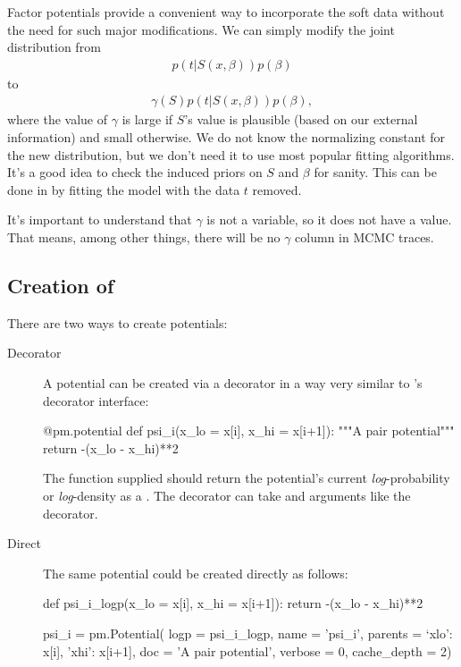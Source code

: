 \documentclass[]{jss}
\begin{document}
Factor potentials provide a convenient way to incorporate the soft data without the need for such major modifications. We can simply modify the joint distribution from
\begin{eqnarray*}
    p(t|S(x,\beta)) p(\beta)
\end{eqnarray*}
to
\begin{eqnarray*}
    \gamma(S) p(t|S(x,\beta)) p(\beta),
\end{eqnarray*}
where the value of $\gamma$ is large if $S$'s value is plausible (based on our external information) and small otherwise. We do not know the normalizing constant for the new distribution, but we don't need it to use most popular fitting algorithms. It's a good idea to check the induced priors on $S$ and $\beta$ for sanity. This can be done in  by fitting the model with the data $t$ removed.

It's important to understand that $\gamma$ is not a variable, so it does not have a value. That means, among other things, there will be no $\gamma$ column in MCMC traces.


\subsection[Creation of Potentials]{Creation of }
There are two ways to create potentials:
\begin{description}
    \item[Decorator] A potential can be created via a decorator in a way very similar to 's decorator interface:
\begin{CodeInput}
@pm.potential
def psi_i(x_lo = x[i], x_hi = x[i+1]):
	"""A pair potential"""
	return -(x_lo - x_hi)**2
\end{CodeInput}
The function supplied should return the potential's current \emph{log}-probability or \emph{log}-density as a  . The  decorator can take  and  arguments like the  decorator.
    \item[Direct] The same potential could be created directly as follows:
\begin{CodeInput}
def psi_i_logp(x_lo = x[i], x_hi = x[i+1]):
	return -(x_lo - x_hi)**2

psi_i = pm.Potential(  logp = psi_i_logp,
                name = 'psi_i',
                parents = {`xlo': x[i], 'xhi': x[i+1]},
                doc = 'A pair potential',
                verbose = 0,
                cache_depth = 2)
\end{CodeInput}
\end{description}
\end{document}
